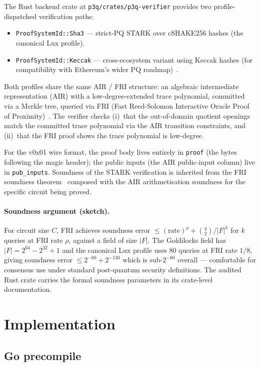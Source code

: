 \documentclass[11pt,a4paper]{article}
\begin{document}
The Rust backend crate at \texttt{p3q/crates/p3q-verifier} provides
two profile-dispatched verification paths:
\begin{itemize}
\item \texttt{ProofSystemId::Sha3} — strict-PQ STARK over cSHAKE256
hashes (the canonical Lux profile).
\item \texttt{ProofSystemId::Keccak} — cross-ecosystem variant using
Keccak hashes (for compatibility with Ethereum's wider PQ
roadmap)~\cite{ethereum-stark}.
\end{itemize}

Both profiles share the same AIR / FRI structure: an algebraic
intermediate representation (AIR) with a low-degree-extended trace
polynomial, committed via a Merkle tree, queried via FRI
(Fast Reed-Solomon Interactive Oracle Proof of
Proximity)~\cite{fri-paper}. The verifier checks (i)~that the
out-of-domain quotient openings match the committed trace
polynomial via the AIR transition constraints, and (ii)~that the FRI
proof shows the trace polynomial is low-degree.

For the v0x01 wire format, the proof body lives entirely in
\texttt{proof} (the bytes following the magic header); the public
inputs (the AIR public-input column) live in \texttt{pub\_inputs}.
Soundness of the STARK verification is inherited from the FRI
soundness theorem~\cite{fri-paper} composed with the AIR
arithmetisation soundness for the specific circuit being proved.

\paragraph{Soundness argument (sketch).}
For circuit size $C$, FRI achieves soundness error $\le
(\text{rate})^{\rho} + \binom{q}{2}/|F|^k$ for $k$ queries at FRI
rate $\rho$, against a field of size $|F|$. The Goldilocks
field has $|F| = 2^{64} - 2^{32} + 1$ and the canonical Lux profile
uses $80$ queries at FRI rate $1/8$, giving soundness error
$\le 2^{-80} + 2^{-130}$ which is sub-$2^{-80}$ overall — comfortable
for consensus use under standard post-quantum security definitions.
The audited Rust crate carries the formal soundness parameters in
its crate-level documentation.

\section{Implementation}\label{sec:impl}

\subsection{Go precompile}
\end{document}
